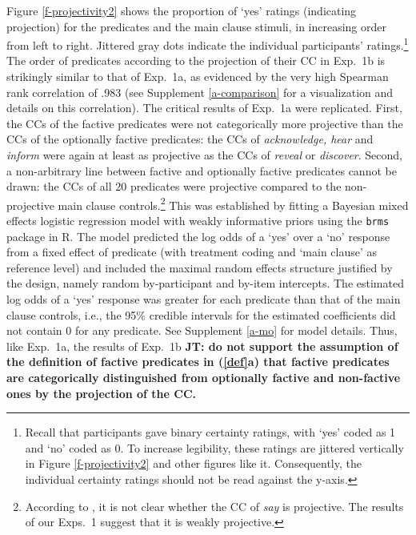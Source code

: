 \documentclass[11pt,fleqn]{article}
\newcommand{\6}{\mbox{$[\hspace*{-.6mm}[$}}
\newcommand{\9}{\mbox{$]\hspace*{-.6mm}]$}}
\newcommand{\jt}[1]{\textbf{\color{blue}JT: #1}}
\begin{document}
Figure \ref{f-projectivity2} shows the proportion of `yes' ratings (indicating projection) for the predicates and the main clause stimuli, in increasing order from left to right. Jittered gray dots indicate the individual participants' ratings.\footnote{Recall that participants gave binary certainty ratings, with `yes' coded as 1 and `no' coded as 0. To increase legibility, these ratings are jittered vertically in Figure \ref{f-projectivity2} and other figures like it. Consequently, the individual certainty ratings should not be read against the y-axis.} The order of predicates according to the projection of their CC in Exp.~1b is strikingly similar to that of Exp.~1a, as evidenced by the very high Spearman rank correlation of .983 (see Supplement \ref{a-comparison} for a visualization and details on this correlation). The critical results of Exp.~1a were replicated. First, the CCs of the factive predicates were not categorically more projective than the CCs of the optionally factive predicates:  the CCs of {\em acknowledge, hear} and {\em inform} were again at least as projective as the CCs of {\em reveal} or {\em discover}. Second, a non-arbitrary line between factive and optionally factive predicates cannot be drawn: the CCs of all 20 predicates were projective compared to the non-projective main clause controls.\footnote{According to \citet[1739]{spector-egre2015}, it is not clear whether the CC of {\em say} is projective. The results of our Exps.~1 suggest that it is weakly projective.}  This was established by fitting a Bayesian mixed effects logistic regression model  with weakly informative priors using the \verb|brms| package in R. The model predicted the log odds of a `yes' over a `no' response from a fixed effect of predicate (with treatment coding and `main clause' as  reference level) and included the maximal random effects structure justified by the design, namely random by-participant and by-item intercepts. The estimated log odds of a `yes' response was greater for each predicate than that of the main clause controls, i.e., the 95\% credible intervals for the estimated coefficients did not contain 0 for any predicate. See Supplement \ref{a-mo} for model details. Thus, like Exp.~1a, the results of Exp.~1b \jt{do not support the assumption of the definition of factive predicates in (\ref{def}a) that factive predicates are categorically distinguished from optionally factive and non-factive ones by the projection of the CC.}
\end{document}
